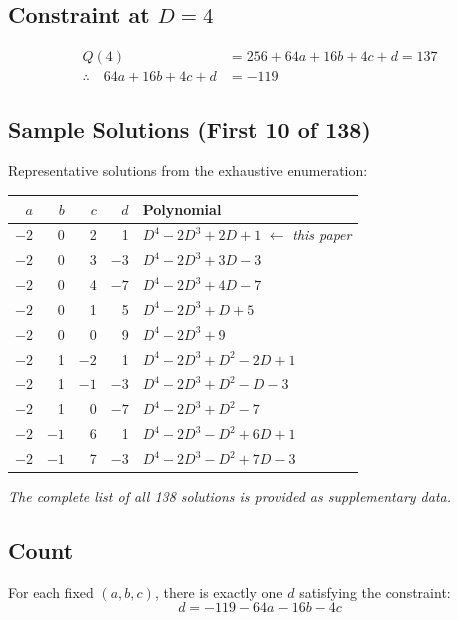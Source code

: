 \documentclass[11pt,a4paper]{article}
\begin{document}
\subsection{Constraint at $D = 4$}

\begin{align}
Q(4) &= 256 + 64a + 16b + 4c + d = 137 \\
\therefore \quad 64a + 16b + 4c + d &= -119
\end{align}

\subsection{Sample Solutions (First 10 of 138)}

Representative solutions from the exhaustive enumeration:

\begin{center}
\begin{tabular}{|r|r|r|r|l|}
\hline
$a$ & $b$ & $c$ & $d$ & Polynomial \\
\hline
$-2$ & 0 & 2 & 1 & $D^4 - 2D^3 + 2D + 1$ \quad $\leftarrow$ \textit{this paper} \\
$-2$ & 0 & 3 & $-3$ & $D^4 - 2D^3 + 3D - 3$ \\
$-2$ & 0 & 4 & $-7$ & $D^4 - 2D^3 + 4D - 7$ \\
$-2$ & 0 & 1 & 5 & $D^4 - 2D^3 + D + 5$ \\
$-2$ & 0 & 0 & 9 & $D^4 - 2D^3 + 9$ \\
$-2$ & 1 & $-2$ & 1 & $D^4 - 2D^3 + D^2 - 2D + 1$ \\
$-2$ & 1 & $-1$ & $-3$ & $D^4 - 2D^3 + D^2 - D - 3$ \\
$-2$ & 1 & 0 & $-7$ & $D^4 - 2D^3 + D^2 - 7$ \\
$-2$ & $-1$ & 6 & 1 & $D^4 - 2D^3 - D^2 + 6D + 1$ \\
$-2$ & $-1$ & 7 & $-3$ & $D^4 - 2D^3 - D^2 + 7D - 3$ \\
\hline
\end{tabular}
\end{center}

\textit{The complete list of all 138 solutions is provided as supplementary data.}

\subsection{Count}

For each fixed $(a, b, c)$, there is exactly one $d$ satisfying the constraint:
\begin{equation}
d = -119 - 64a - 16b - 4c
\end{equation}
\end{document}
